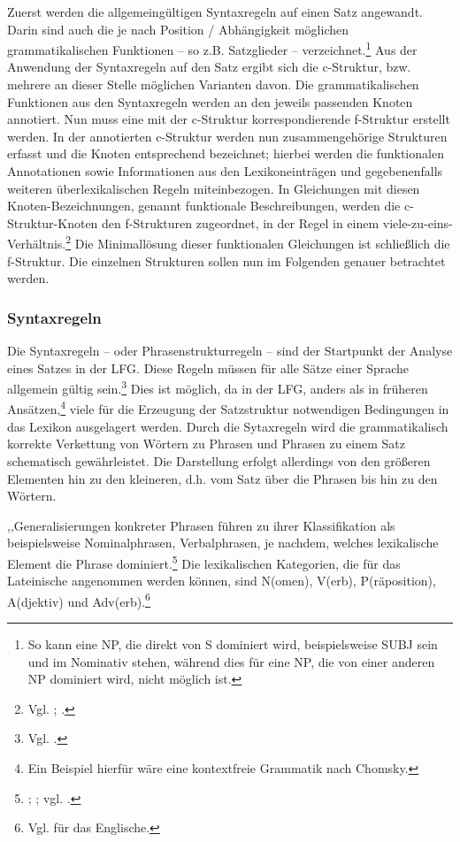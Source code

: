 \documentclass[12pt,a4paper]{article}
\begin{document}
Zuerst werden die allgemeingültigen Syntaxregeln auf einen Satz angewandt. Darin sind auch die je nach Position / Abhängigkeit möglichen grammatikalischen Funktionen -- so z.B. Satzglieder -- verzeichnet.\footnote{So kann eine NP, die direkt von S dominiert wird, beispielsweise SUBJ sein und im Nominativ stehen, während dies für eine NP, die von einer anderen NP dominiert wird, nicht möglich ist.} Aus der Anwendung der Syntaxregeln auf den Satz ergibt sich die c-Struktur, bzw. mehrere an dieser Stelle möglichen Varianten davon. Die grammatikalischen Funktionen aus den Syntaxregeln werden an den jeweils passenden Knoten annotiert. Nun muss eine mit der c-Struktur korrespondierende f-Struktur erstellt werden. In der annotierten c-Struktur werden nun zusammengehörige Strukturen erfasst und die Knoten entsprechend bezeichnet; hierbei werden die funktionalen Annotationen sowie Informationen aus den Lexikoneinträgen und gegebenenfalls weiteren überlexikalischen Regeln miteinbezogen. In Gleichungen mit diesen Knoten-Bezeichnungen, genannt funktionale Beschreibungen, werden die c-Struktur-Knoten den f-Strukturen zugeordnet, in der Regel in einem viele-zu-eins-Verhältnis.\footnote{Vgl. \cite[64]{Falk}; \cite[9]{Skript}.} Die Minimallösung dieser funktionalen Gleichungen ist schließlich die f-Struktur.
Die einzelnen Strukturen sollen nun im Folgenden genauer betrachtet werden.

\subsubsection{Syntaxregeln}
Die Syntaxregeln -- oder Phrasenstrukturregeln -- sind der Startpunkt der Analyse eines Satzes in der LFG. Diese Regeln müssen für alle Sätze einer Sprache allgemein gültig sein.\footnote{Vgl. \cite[47]{Dal}.} Dies ist möglich, da in der LFG, anders als in früheren Ansätzen,\footnote{Ein Beispiel hierfür wäre eine kontextfreie Grammatik nach Chomsky.} viele für die Erzeugung der Satzstruktur notwendigen Bedingungen in das Lexikon ausgelagert werden. Durch die Sytaxregeln wird die grammatikalisch korrekte Verkettung von Wörtern zu Phrasen und Phrasen zu einem Satz schematisch gewährleistet. Die Darstellung erfolgt allerdings von den größeren Elementen hin zu den kleineren, d.h. vom Satz über die Phrasen bis hin zu den Wörtern. 

,,Generalisierungen konkreter Phrasen führen zu ihrer Klassifikation als beispielsweise Nominalphrasen, Verbalphrasen, je nachdem, welches lexikalische Element die Phrase dominiert.\footnote{\cite[47]{Dal}; \cite[53; 58-9]{Dal}; vgl. \cite[15]{Rohrer}.} Die lexikalischen Kategorien, die für das Lateinische angenommen werden können, sind N(omen), V(erb), P(räposition), A(djektiv) und Adv(erb).\footnote{Vgl. \cite[46; 52]{Dal} für das Englische.}
\end{document}

